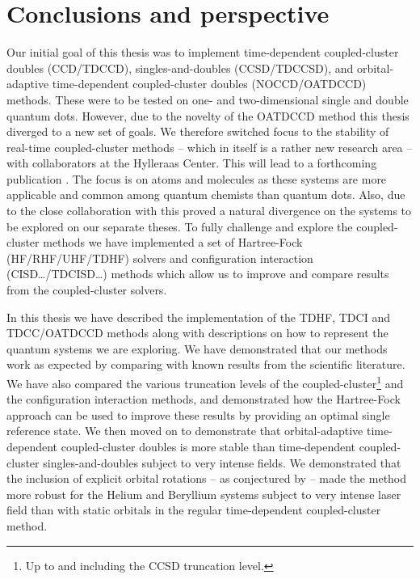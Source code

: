 \chapter{Conclusions and perspective}
    Our initial goal of this thesis was to implement time-dependent
    coupled-cluster doubles (CCD/TDCCD), singles-and-doubles (CCSD/TDCCSD), and
    orbital-adaptive time-dependent coupled-cluster doubles (NOCCD/OATDCCD)
    methods.
    These were to be tested on one- and two-dimensional single and double
    quantum dots.
    However, due to the novelty of the OATDCCD method this thesis diverged to a
    new set of goals.
    We therefore switched focus to the stability of real-time coupled-cluster
    methods -- which in itself is a rather new research area -- with
    collaborators at the Hylleraas Center.
    This will lead to a forthcoming publication \cite{oa-stability}.
    The focus is on atoms and molecules as these systems are more applicable and
    common among quantum chemists than quantum dots.
    Also, due to the close collaboration with \citeauthor{greg-winther}
    \cite{greg-winther} this proved a natural divergence on the systems to be
    explored on our separate theses.
    To fully challenge and explore the coupled-cluster methods we have implemented
    a set of Hartree-Fock (HF/RHF/UHF/TDHF) solvers and configuration
    interaction (CISD\dots/TDCISD\dots) methods which allow us to improve and
    compare results from the coupled-cluster solvers.

    In this thesis we have described the implementation of the TDHF, TDCI and
    TDCC/OATDCCD methods along with descriptions on how to represent the quantum
    systems we are exploring.
    We have demonstrated that our methods work as expected by comparing with known
    results from the scientific literature.
    We have also compared the various truncation levels of the
    coupled-cluster\footnote{%
        Up to and including the CCSD truncation level.
    }
    and the configuration interaction methods, and demonstrated how the
    Hartree-Fock approach can be used to improve these results by providing an
    optimal single reference state.
    We then moved on to demonstrate that orbital-adaptive time-dependent
    coupled-cluster doubles is more stable than time-dependent coupled-cluster
    singles-and-doubles subject to very intense fields.
    We demonstrated that the inclusion of explicit orbital rotations -- as
    conjectured by \citeauthor{pedersen2018symplectic}
    \cite{pedersen2018symplectic} -- made the method more robust for the Helium
    and Beryllium systems subject to very intense laser field than with static
    orbitals in the regular time-dependent coupled-cluster method.

